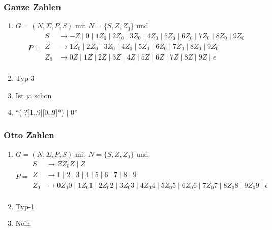 \documentclass[a4paper, fleqn]{article}
\begin{document}
\subsubsection{Ganze Zahlen}
\begin{enumerate}[label=\alph*)]
    \item $G=(N,\Sigma,P,S)$ mit $N=\{S,Z,Z_0\}$ und
    \[P=
    \begin{split}
        S&\rightarrow -Z\mid 0\mid 1Z_0\mid 2Z_0\mid 3Z_0\mid 4Z_0\mid 5Z_0\mid 6Z_0\mid 7Z_0\mid 8Z_0\mid 9Z_0\\
        Z&\rightarrow 1Z_0\mid 2Z_0\mid 3Z_0\mid 4Z_0\mid 5Z_0\mid 6Z_0\mid 7Z_0\mid 8Z_0\mid 9Z_0\\
        Z_0&\rightarrow 0Z\mid 1Z\mid 2Z\mid 3Z\mid 4Z\mid 5Z\mid 6Z\mid 7Z\mid 8Z\mid 9Z\mid \epsilon\\
    \end{split}
    \]
    \item Typ-3
    \item Ist ja schon
    \item ``(-?[1..9][0..9]*) $|$ 0''
\end{enumerate}
\subsubsection{Otto Zahlen}
\begin{enumerate}[label=\alph*)]
    \item $G=(N,\Sigma,P,S)$ mit $N=\{S,Z,Z_0\}$ und
    \[P=
    \begin{split}
        S&\rightarrow ZZ_0 Z \mid Z\\
        Z&\rightarrow 1\mid 2\mid 3\mid 4\mid 5\mid 6\mid 7\mid 8\mid 9\\
        Z_0&\rightarrow 0Z_0 0\mid 1Z_0 1\mid 2Z_0 2\mid 3Z_0 3\mid 4Z_0 4\mid 5Z_0 5\mid 6Z_0 6\mid 7Z_0 7\mid 8Z_0 8\mid 9Z_0 9\mid \epsilon\\
    \end{split}
    \]
    \item Typ-1
    \item Nein
\end{enumerate}
\end{document}
